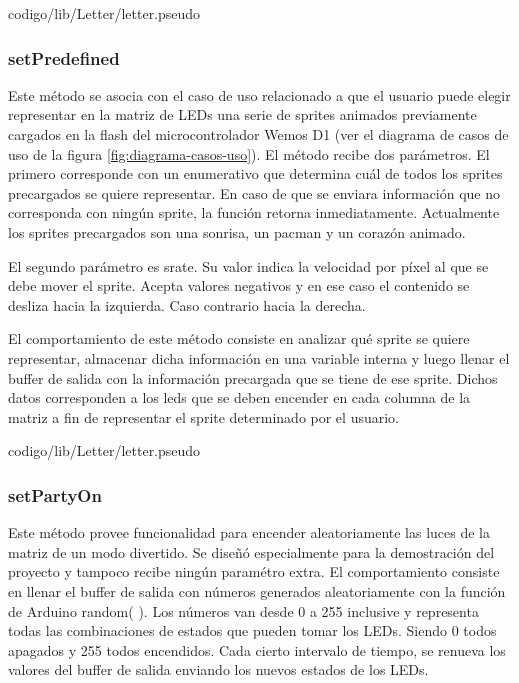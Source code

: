         
                         {codigo/lib/Letter/letter.pseudo}
                   
                             
        \subsubsection{setPredefined}
        Este método se asocia con el caso de uso relacionado a que el usuario puede elegir representar en la matriz de LEDs una serie de sprites animados previamente cargados en la flash del microcontrolador Wemos D1 (ver el diagrama de casos de uso de la figura \ref{fig:diagrama-casos-uso}). El método recibe dos parámetros. El primero corresponde con un enumerativo que determina cuál de todos los sprites precargados se quiere representar. En caso de que se enviara información que no corresponda con ningún sprite, la función retorna inmediatamente. Actualmente los sprites precargados son una sonrisa, un pacman y un corazón animado.
        
        El segundo parámetro es srate. Su valor indica la velocidad por píxel al que se debe mover el sprite. Acepta valores negativos y en ese caso el contenido se desliza hacia la izquierda. Caso contrario hacia la derecha.
        
        El comportamiento de este método consiste en analizar qué sprite se quiere representar, almacenar dicha información en una variable interna y luego llenar el buffer de salida con la información precargada que se tiene de ese sprite. Dichos datos corresponden a los leds que se deben encender en cada columna de la matriz a fin de representar el sprite determinado por el usuario.

        
                     {codigo/lib/Letter/letter.pseudo}
                     
                     
        \subsubsection{setPartyOn}
        Este método provee funcionalidad para encender aleatoriamente las luces de la matriz de un modo divertido. Se diseñó especialmente para la demostración del proyecto y tampoco recibe ningún paramétro extra.
        El comportamiento consiste en llenar el buffer de salida con números generados aleatoriamente con la función de Arduino random( ). Los números van desde 0 a 255 inclusive y representa todas las combinaciones de estados que pueden tomar los LEDs. Siendo 0 todos apagados y 255 todos encendidos. Cada cierto intervalo de tiempo, se renueva los valores del buffer de salida enviando los nuevos estados de los LEDs.
        
